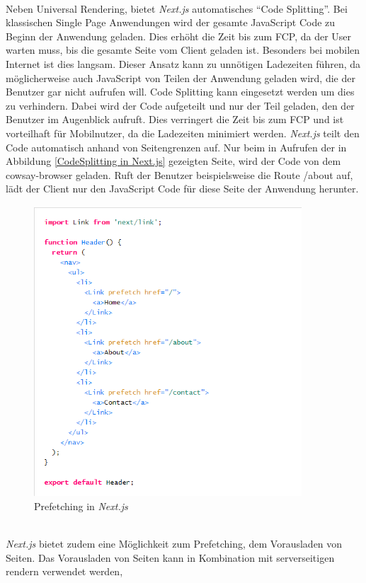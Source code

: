 \documentclass[runningheads]{llncs}
\begin{document}
\\
Neben Universal Rendering, bietet \textit{Next.js} automatisches “Code Splitting”. 
Bei klassischen Single Page Anwendungen wird der gesamte JavaScript Code 
zu Beginn der Anwendung geladen. 
Dies erhöht die Zeit bis zum FCP, da der User warten muss, 
bis die gesamte Seite vom Client geladen ist. 
Besonders bei mobilen Internet ist dies langsam. 
Dieser Ansatz kann zu unnötigen Ladezeiten führen, 
da möglicherweise auch JavaScript von Teilen der Anwendung geladen wird, 
die der Benutzer gar nicht aufrufen will. 
Code Splitting kann eingesetzt werden um dies zu verhindern. 
Dabei wird der Code aufgeteilt und nur der Teil geladen, 
den der Benutzer im Augenblick aufruft. 
Dies verringert die Zeit bis zum FCP und ist vorteilhaft für Mobilnutzer, 
da die Ladezeiten minimiert werden.
\textit{Next.js} teilt den Code automatisch anhand von Seitengrenzen auf. 
Nur beim in Aufrufen der in Abbildung \ref{CodeSplitting in Next.js} gezeigten Seite,
wird der Code von dem cowsay-browser geladen.
Ruft der Benutzer beispielsweise die Route /about auf, 
lädt der Client nur den JavaScript Code für diese Seite der Anwendung herunter.
\begin{figure}
  \centering
  \includegraphics[width=10cm]{images/prefetchnext}
  \caption{Prefetching in \textit{Next.js}}
  \label{Prefetching in Next.js}
\end{figure}
\\
\textit{Next.js} bietet zudem eine Möglichkeit zum Prefetching, 
dem Vorausladen von Seiten. 
Das Vorausladen von Seiten kann in Kombination mit serverseitigen rendern verwendet werden, 
\end{document}
